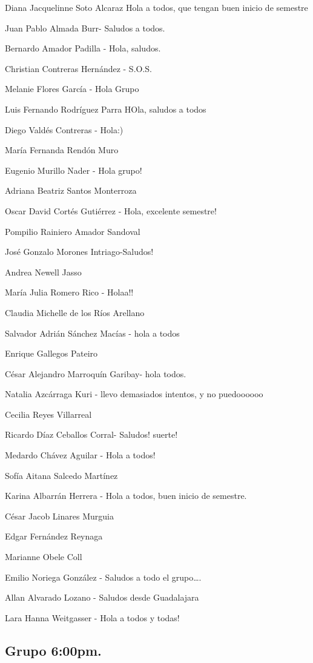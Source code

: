 \documentclass[12pt,halfline,a4paper,]{ouparticle}
\begin{document}
Diana Jacquelinne Soto Alcaraz Hola a todos, que tengan buen inicio de
semestre

Juan Pablo Almada Burr- Saludos a todos.

Bernardo Amador Padilla - Hola, saludos.

Christian Contreras Hernández - S.O.S.

Melanie Flores García - Hola Grupo

Luis Fernando Rodríguez Parra HOla, saludos a todos

Diego Valdés Contreras - Hola:)

María Fernanda Rendón Muro

Eugenio Murillo Nader - Hola grupo!

Adriana Beatriz Santos Monterroza

Oscar David Cortés Gutiérrez - Hola, excelente semestre!

Pompilio Rainiero Amador Sandoval

José Gonzalo Morones Intriago-Saludos!

Andrea Newell Jasso

María Julia Romero Rico - Holaa!!

Claudia Michelle de los Ríos Arellano

Salvador Adrián Sánchez Macías - hola a todos

Enrique Gallegos Pateiro

César Alejandro Marroquín Garibay- hola todos.

Natalia Azcárraga Kuri - llevo demasiados intentos, y no puedoooooo

Cecilia Reyes Villarreal

Ricardo Díaz Ceballos Corral- Saludos! suerte!

Medardo Chávez Aguilar - Hola a todos!

Sofía Aitana Salcedo Martínez

Karina Albarrán Herrera - Hola a todos, buen inicio de semestre.

César Jacob Linares Murguia

Edgar Fernández Reynaga

Marianne Obele Coll

Emilio Noriega González - Saludos a todo el grupo\ldots.

Allan Alvarado Lozano - Saludos desde Guadalajara

Lara Hanna Weitgasser - Hola a todos y todas!

\hypertarget{grupo-600pm.}{%
\subsection{Grupo 6:00pm.}\label{grupo-600pm.}}
\end{document}
